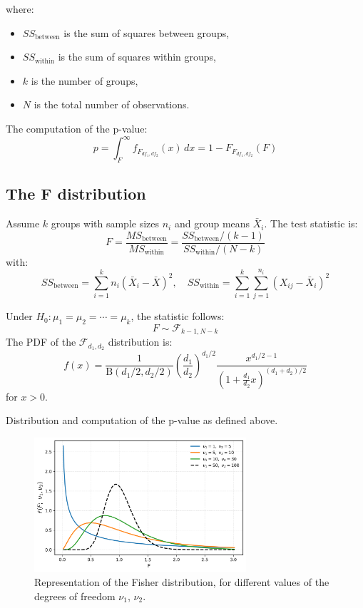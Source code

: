 \documentclass{book}
\begin{document}
where:
\begin{itemize}
  \item $SS_{\text{between}}$ is the sum of squares between groups,
  \item $SS_{\text{within}}$ is the sum of squares within groups,
  \item $k$ is the number of groups,
  \item $N$ is the total number of observations.
\end{itemize}

The computation of the p-value:
\[
p = \int_{F}^{\infty} f_{F_{df_1, df_2}}(x)\,dx = 1 - F_{F_{df_1, df_2}}(F)
\]

\subsection*{The F distribution}

Assume \( k \) groups with sample sizes \( n_i \) and group means \( \bar{X}_i \). The test statistic is:
\[
F = \frac{MS_{\text{between}}}{MS_{\text{within}}} = \frac{SS_{\text{between}} / (k - 1)}{SS_{\text{within}} / (N - k)}
\]
with:
\[
SS_{\text{between}} = \sum_{i=1}^{k} n_i (\bar{X}_i - \bar{X})^2, \quad SS_{\text{within}} = \sum_{i=1}^{k} \sum_{j=1}^{n_i} (X_{ij} - \bar{X}_i)^2
\]

Under \( H_0: \mu_1 = \mu_2 = \cdots = \mu_k \), the statistic follows:
\[
F \sim \mathcal{F}_{k-1, N-k}
\]
The PDF of the \( \mathcal{F}_{d_1, d_2} \) distribution is:
\[
f(x) = \frac{1}{\mathrm{B}(d_1/2, d_2/2)} \left(\frac{d_1}{d_2}\right)^{d_1/2} \frac{x^{d_1/2 - 1}}{\left(1 + \frac{d_1}{d_2}x\right)^{(d_1 + d_2)/2}}
\]
for \( x > 0 \).

Distribution and computation of the p-value as defined above.

\begin{figure}[ht]
    \centering
    \includegraphics[width=0.7\textwidth]{figures/chapter4/f_distribution.png}
    \caption{Representation of the Fisher distribution, for different values of the degrees of freedom $\nu_1$, $\nu_2$.}
    \label{fig:f_distribution}
\end{figure}
\end{document}
